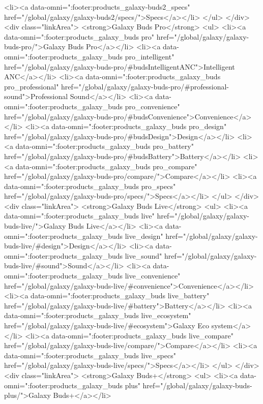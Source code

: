 {{{{{{{{{{{{{{{{{{{{{{{{{{{{{{{{{{{{{{{{{{{{{{{{{{{{{				<li><a data-omni=":footer:products_galaxy-buds2_specs" href="/global/galaxy/galaxy-buds2/specs/">Specs</a></li>
			</ul>
		</div>
		<div class="linkArea">
			<strong>Galaxy Buds Pro</strong>
			<ul>
				<li><a data-omni=":footer:products_galaxy_buds pro" href="/global/galaxy/galaxy-buds-pro/">Galaxy Buds Pro</a></li>
				<li><a data-omni=":footer:products_galaxy_buds pro_intelligent" href="/global/galaxy/galaxy-buds-pro/#budsIntelligentANC">Intelligent ANC</a></li>
				<li><a data-omni=":footer:products_galaxy_buds pro_professional" href="/global/galaxy/galaxy-buds-pro/#professional-sound">Professional Sound</a></li>
				<li><a data-omni=":footer:products_galaxy_buds pro_convenience" href="/global/galaxy/galaxy-buds-pro/#budsConvenience">Convenience</a></li>
				<li><a data-omni=":footer:products_galaxy_buds pro_design" href="/global/galaxy/galaxy-buds-pro/#budsDesign">Design</a></li>
				<li><a data-omni=":footer:products_galaxy_buds pro_battery" href="/global/galaxy/galaxy-buds-pro/#budsBattery">Battery</a></li>
				<li><a data-omni=":footer:products_galaxy_buds pro_compare" href="/global/galaxy/galaxy-buds-pro/compare/">Compare</a></li>
				<li><a data-omni=":footer:products_galaxy_buds pro_specs" href="/global/galaxy/galaxy-buds-pro/specs/">Specs</a></li>
			</ul>
		</div>
		<div class="linkArea">
			<strong>Galaxy Buds Live</strong>
			<ul>
				<li><a data-omni=":footer:products_galaxy_buds live" href="/global/galaxy/galaxy-buds-live/">Galaxy Buds Live</a></li>
				<li><a data-omni=":footer:products_galaxy_buds live_design" href="/global/galaxy/galaxy-buds-live/#design">Design</a></li>
				<li><a data-omni=":footer:products_galaxy_buds live_sound" href="/global/galaxy/galaxy-buds-live/#sound">Sound</a></li>
				<li><a data-omni=":footer:products_galaxy_buds live_convenience" href="/global/galaxy/galaxy-buds-live/#convenience">Convenience</a></li>
				<li><a data-omni=":footer:products_galaxy_buds live_battery" href="/global/galaxy/galaxy-buds-live/#battery">Battery</a></li>
				<li><a data-omni=":footer:products_galaxy_buds live_ecosystem" href="/global/galaxy/galaxy-buds-live/#ecosystem">Galaxy Eco system</a></li>
				<li><a data-omni=":footer:products_galaxy_buds live_compare" href="/global/galaxy/galaxy-buds-live/compare/">Compare</a></li>
				<li><a data-omni=":footer:products_galaxy_buds live_specs" href="/global/galaxy/galaxy-buds-live/specs/">Specs</a></li>
			</ul>
		</div>
		<div class="linkArea">
			<strong>Galaxy Buds+</strong>
			<ul>
				<li><a data-omni=":footer:products_galaxy_buds plus" href="/global/galaxy/galaxy-buds-plus/">Galaxy Buds+</a></li>
}}}}}}}}}}}}}}}}}}}}}}}}}}}}}}}}}}}}}}}}}}}}}}}}}}}}}
